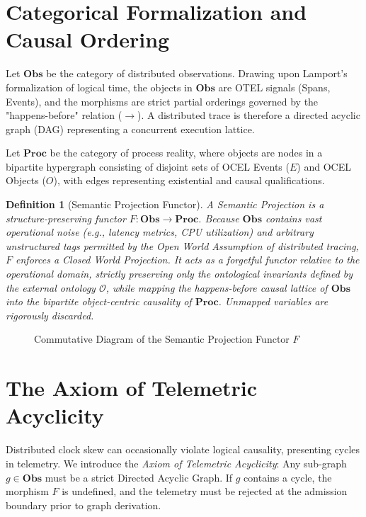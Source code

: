 \documentclass[12pt,a4paper,oneside]{book}
\newtheorem{definition}{Definition}[chapter]
\begin{document}
\section{Categorical Formalization and Causal Ordering}
Let $\mathbf{Obs}$ be the category of distributed observations. Drawing upon Lamport's formalization of logical time, the objects in $\mathbf{Obs}$ are OTEL signals (Spans, Events), and the morphisms are strict partial orderings governed by the "happens-before" relation ($\rightarrow$). A distributed trace is therefore a directed acyclic graph (DAG) representing a concurrent execution lattice.

Let $\mathbf{Proc}$ be the category of process reality, where objects are nodes in a bipartite hypergraph consisting of disjoint sets of OCEL Events ($E$) and OCEL Objects ($O$), with edges representing existential and causal qualifications.

\begin{definition}[Semantic Projection Functor]
A Semantic Projection is a structure-preserving functor $F: \mathbf{Obs} \to \mathbf{Proc}$. Because $\mathbf{Obs}$ contains vast operational noise (e.g., latency metrics, CPU utilization) and arbitrary unstructured tags permitted by the Open World Assumption of distributed tracing, $F$ enforces a \textit{Closed World Projection}. It acts as a \textit{forgetful functor} relative to the operational domain, strictly preserving only the ontological invariants defined by the external ontology $\mathcal{O}$, while mapping the happens-before causal lattice of $\mathbf{Obs}$ into the bipartite object-centric causality of $\mathbf{Proc}$. Unmapped variables are rigorously discarded.
\end{definition}

\begin{figure}[h]
\centering
{}
\caption{Commutative Diagram of the Semantic Projection Functor $F$}
\end{figure}

\section{The Axiom of Telemetric Acyclicity}
Distributed clock skew can occasionally violate logical causality, presenting cycles in telemetry. We introduce the \textit{Axiom of Telemetric Acyclicity}: Any sub-graph $g \in \mathbf{Obs}$ must be a strict Directed Acyclic Graph. If $g$ contains a cycle, the morphism $F$ is undefined, and the telemetry must be rejected at the admission boundary prior to graph derivation.
\end{document}
